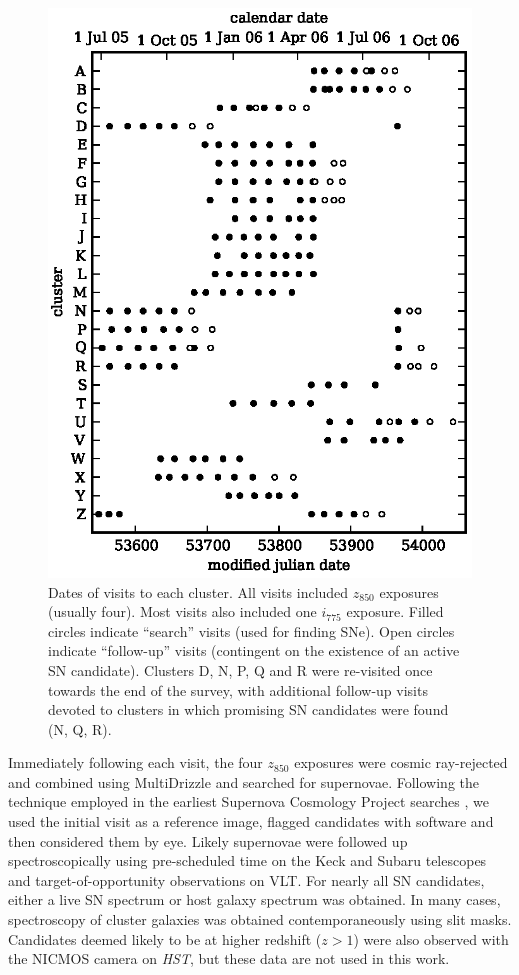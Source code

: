 \begin{figure}
\centering
\includegraphics{figures/survey/visits.eps}
\caption[Dates of visits to each cluster]{Dates of visits to each
  cluster. All visits included $z_{850}$ exposures (usually
  four). Most visits also included one $i_{775}$ exposure. Filled
  circles indicate ``search'' visits (used for finding SNe). Open
  circles indicate ``follow-up'' visits (contingent on the existence
  of an active SN candidate). Clusters D, N, P, Q and R were
  re-visited once towards the end of the survey, with additional
  follow-up visits devoted to clusters in which promising SN
  candidates were found (N, Q, R). \label{fig:visits}}
\end{figure}


Immediately following each visit, the four $z_{850}$ exposures were
cosmic ray-rejected and combined using {\sc MultiDrizzle}
\citep{fruchter02a,koekemoer02a} and searched for
supernovae. Following the technique employed in the earliest Supernova
Cosmology Project searches \citep{perlmutter95a,perlmutter97a}, we
used the initial visit as a reference image, flagged candidates with
software and then considered them by eye. Likely supernovae were
followed up spectroscopically using pre-scheduled time on the Keck
and Subaru telescopes and target-of-opportunity observations on VLT.
For nearly all SN candidates, either a live SN spectrum or host galaxy
spectrum was obtained. In many cases, spectroscopy of cluster galaxies
was obtained contemporaneously using slit masks. Candidates deemed
likely to be at higher redshift ($z>1$) were also observed with the
NICMOS camera on {\it HST}, but these data are not used in this work.

